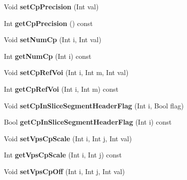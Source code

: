 \begin{DoxyCompactItemize}
\mbox{\label{class_t_com_v_p_s_a289afd394fd4d3c53669353653d3063e}} 
Void {\bfseries set\+Cp\+Precision} (Int val)
\item 
\mbox{\label{class_t_com_v_p_s_ae65eab5d3c9aebf3c089f40e0952afd5}} 
Int {\bfseries get\+Cp\+Precision} () const
\item 
\mbox{\label{class_t_com_v_p_s_afad0e89cf9645d9ff8ff5e0aeab528ac}} 
Void {\bfseries set\+Num\+Cp} (Int i, Int val)
\item 
\mbox{\label{class_t_com_v_p_s_ac3d372b034ed04eaaeb2a03b0b151a6e}} 
Int {\bfseries get\+Num\+Cp} (Int i) const
\item 
\mbox{\label{class_t_com_v_p_s_a106d882ecbc0878f10bdc6fdd23b4bd6}} 
Void {\bfseries set\+Cp\+Ref\+Voi} (Int i, Int m, Int val)
\item 
\mbox{\label{class_t_com_v_p_s_a90c23ff76dfd8f9c306773d49512f999}} 
Int {\bfseries get\+Cp\+Ref\+Voi} (Int i, Int m) const
\item 
\mbox{\label{class_t_com_v_p_s_a96e5cfe95d0bd26cecd8ac7e4a2dc87a}} 
Void {\bfseries set\+Cp\+In\+Slice\+Segment\+Header\+Flag} (Int i, Bool flag)
\item 
\mbox{\label{class_t_com_v_p_s_aa2384ed37bf016b76ba8b5ba18bb2fc1}} 
Bool {\bfseries get\+Cp\+In\+Slice\+Segment\+Header\+Flag} (Int i) const
\item 
\mbox{\label{class_t_com_v_p_s_aca49fa2256073f79009ed333eef53ebb}} 
Void {\bfseries set\+Vps\+Cp\+Scale} (Int i, Int j, Int val)
\item 
\mbox{\label{class_t_com_v_p_s_a67b9038798a4d6017dd7c7ad4987b05b}} 
Int {\bfseries get\+Vps\+Cp\+Scale} (Int i, Int j) const
\item 
\mbox{\label{class_t_com_v_p_s_aadaa268072e5605d52ed47093b7505ec}} 
Void {\bfseries set\+Vps\+Cp\+Off} (Int i, Int j, Int val)
\item 

\end{DoxyCompactItemize}
